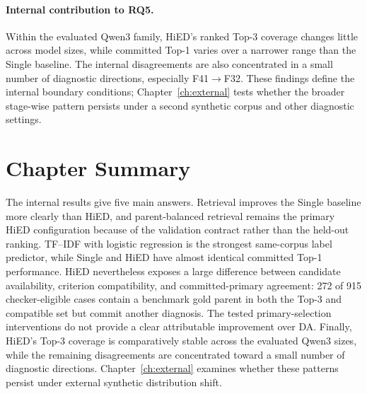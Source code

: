 \paragraph{Internal contribution to RQ5.}
Within the evaluated Qwen3 family, HiED's ranked Top-3 coverage changes little across model sizes, while committed Top-1 varies over a narrower range than the Single baseline. The internal disagreements are also concentrated in a small number of diagnostic directions, especially F41$\rightarrow$F32. These findings define the internal boundary conditions; Chapter~\ref{ch:external} tests whether the broader stage-wise pattern persists under a second synthetic corpus and other diagnostic settings.

\section{Chapter Summary}

The internal results give five main answers. Retrieval improves the Single baseline more clearly than HiED, and parent-balanced retrieval remains the primary HiED configuration because of the validation contract rather than the held-out ranking. TF--IDF with logistic regression is the strongest same-corpus label predictor, while Single and HiED have almost identical committed Top-1 performance. HiED nevertheless exposes a large difference between candidate availability, criterion compatibility, and committed-primary agreement: 272 of 915 checker-eligible cases contain a benchmark gold parent in both the Top-3 and compatible set but commit another diagnosis. The tested primary-selection interventions do not provide a clear attributable improvement over DA. Finally, HiED's Top-3 coverage is comparatively stable across the evaluated Qwen3 sizes, while the remaining disagreements are concentrated toward a small number of diagnostic directions. Chapter~\ref{ch:external} examines whether these patterns persist under external synthetic distribution shift.
